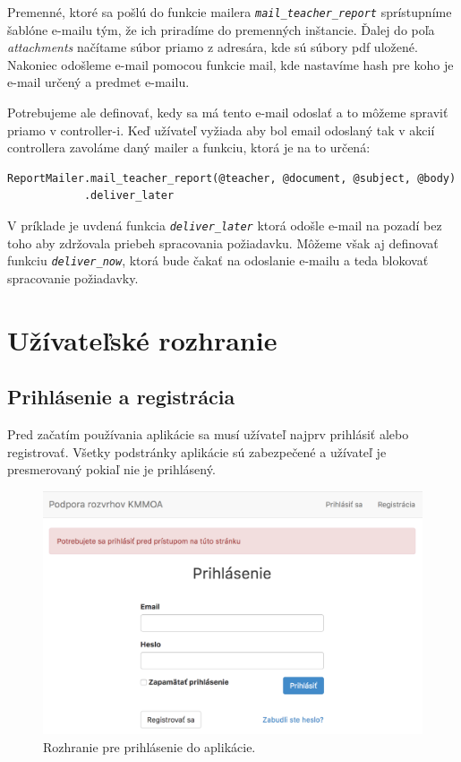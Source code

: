 Premenné, ktoré sa pošlú do funkcie mailera \emph{\texttt{mail\_teacher\_report}} sprístupníme šablóne e-mailu tým, že ich priradíme do premenných inštancie. Ďalej do poľa \emph{attachments} načítame súbor priamo z adresára, kde sú súbory pdf uložené. Nakoniec odošleme e-mail pomocou funkcie mail, kde nastavíme hash pre koho je e-mail určený a predmet e-mailu.

Potrebujeme ale definovať, kedy sa má tento e-mail odoslať a to môžeme spraviť priamo v controller-i. Keď užívateľ vyžiada aby bol email odoslaný tak v akcií controllera zavoláme daný mailer a funkciu, ktorá je na to určená:

\begin{verbatim}
ReportMailer.mail_teacher_report(@teacher, @document, @subject, @body)
            .deliver_later
\end{verbatim}

V príklade je uvdená funkcia \emph{\texttt{deliver\_later}} ktorá odošle e-mail na pozadí bez toho aby zdržovala priebeh spracovania požiadavku. Môžeme však aj definovať funkciu \emph{\texttt{deliver\_now}}, ktorá bude čakať na odoslanie e-mailu a teda blokovať spracovanie požiadavky.

\clearpage
\section{Užívateľské rozhranie}

\subsection{Prihlásenie a registrácia}

Pred začatím používania aplikácie sa musí užívateľ najprv prihlásiť alebo registrovať. Všetky podstránky aplikácie sú zabezpečené a užívateľ je presmerovaný pokiaľ nie je prihlásený.

\begin{figure}[!htb]
  \centering
  \includegraphics[width=1\textwidth]{content/images/ui/login}
  \caption{Rozhranie pre prihlásenie do aplikácie.}
\end{figure}


